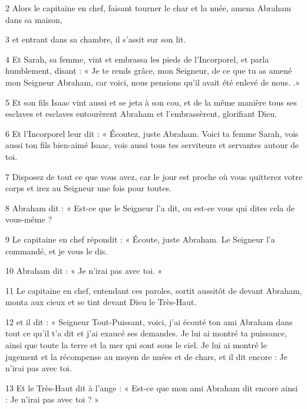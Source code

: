 \par 2 Alors le capitaine en chef, faisant tourner le char et la nuée, amena Abraham dans sa maison,

\par 3 et entrant dans sa chambre, il s'assit sur son lit.

\par 4 Et Sarah, sa femme, vint et embrassa les pieds de l'Incorporel, et parla humblement, disant : « Je te rends grâce, mon Seigneur, de ce que tu as amené mon Seigneur Abraham, car voici, nous pensions qu'il avait été enlevé de nous. .»

\par 5 Et son fils Isaac vint aussi et se jeta à son cou, et de la même manière tous ses esclaves et esclaves entourèrent Abraham et l'embrassèrent, glorifiant Dieu.

\par 6 Et l'Incorporel leur dit : « Écoutez, juste Abraham. Voici ta femme Sarah, vois aussi ton fils bien-aimé Isaac, vois aussi tous tes serviteurs et servantes autour de toi.

\par 7 Disposez de tout ce que vous avez, car le jour est proche où vous quitterez votre corps et irez au Seigneur une fois pour toutes.

\par 8 Abraham dit : « Est-ce que le Seigneur l'a dit, ou est-ce vous qui dites cela de vous-même ?

\par 9 Le capitaine en chef répondit : « Écoute, juste Abraham. Le Seigneur l'a commandé, et je vous le dis.

\par 10 Abraham dit : « Je n'irai pas avec toi. »

\par 11 Le capitaine en chef, entendant ces paroles, sortit aussitôt de devant Abraham, monta aux cieux et se tint devant Dieu le Très-Haut.

\par 12 et il dit : « Seigneur Tout-Puissant, voici, j'ai écouté ton ami Abraham dans tout ce qu'il t'a dit et j'ai exaucé ses demandes. Je lui ai montré ta puissance, ainsi que toute la terre et la mer qui sont sous le ciel. Je lui ai montré le jugement et la récompense au moyen de nuées et de chars, et il dit encore : Je n'irai pas avec toi.

\par 13 Et le Très-Haut dit à l'ange : « Est-ce que mon ami Abraham dit encore ainsi : Je n'irai pas avec toi ? »

